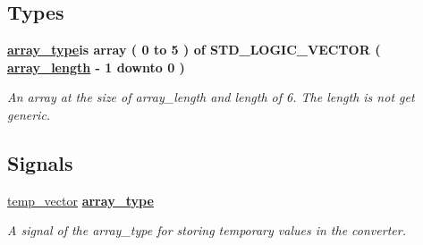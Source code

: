 \subsection*{Types}
 \begin{DoxyCompactItemize}
\item 
\hypertarget{classbin2bcd_1_1converter_a30db87baa00a17c4425999fa5f359bb3}{{\bfseries \hyperlink{classbin2bcd_1_1converter_a30db87baa00a17c4425999fa5f359bb3}{array\-\_\-type}{\bfseries \textcolor{vhdlkeyword}{is}\textcolor{vhdlchar}{ }\textcolor{vhdlchar}{ }\textcolor{vhdlkeyword}{array}\textcolor{vhdlchar}{ }\textcolor{vhdlchar}{(}\textcolor{vhdlchar}{ } \textcolor{vhdldigit}{0} \textcolor{vhdlchar}{ }\textcolor{vhdlchar}{ }\textcolor{vhdlchar}{ }\textcolor{vhdlkeyword}{to}\textcolor{vhdlchar}{ }\textcolor{vhdlchar}{ }\textcolor{vhdlchar}{ } \textcolor{vhdldigit}{5} \textcolor{vhdlchar}{ }\textcolor{vhdlchar}{)}\textcolor{vhdlchar}{ }\textcolor{vhdlchar}{ }\textcolor{vhdlkeyword}{of}\textcolor{vhdlchar}{ }\textcolor{comment}{S\-T\-D\-\_\-\-L\-O\-G\-I\-C\-\_\-\-V\-E\-C\-T\-O\-R}\textcolor{vhdlchar}{ }\textcolor{vhdlchar}{(}\textcolor{vhdlchar}{ }\textcolor{vhdlchar}{ }{\bfseries \hyperlink{classbin2bcd_1_1converter_a0cc376987d43bd9d544cbaede089b0cf}{array\-\_\-length}} \textcolor{vhdlchar}{ }\textcolor{vhdlchar}{-\/}\textcolor{vhdlchar}{ } \textcolor{vhdldigit}{1} \textcolor{vhdlchar}{ }\textcolor{vhdlchar}{ }\textcolor{vhdlchar}{ }\textcolor{vhdlkeyword}{downto}\textcolor{vhdlchar}{ }\textcolor{vhdlchar}{ }\textcolor{vhdlchar}{ } \textcolor{vhdldigit}{0} \textcolor{vhdlchar}{ }\textcolor{vhdlchar}{)}\textcolor{vhdlchar}{ }}} }\label{classbin2bcd_1_1converter_a30db87baa00a17c4425999fa5f359bb3}

\begin{DoxyCompactList}\small\item\em An array at the size of array\-\_\-length and length of 6. The length is not get generic. \end{DoxyCompactList}\end{DoxyCompactItemize}
\subsection*{Signals}
 \begin{DoxyCompactItemize}
\item 
\hypertarget{classbin2bcd_1_1converter_aa35c068917536e24186e420d790f1c2f}{\hyperlink{classbin2bcd_1_1converter_aa35c068917536e24186e420d790f1c2f}{temp\-\_\-vector} {\bfseries {\bfseries \hyperlink{classbin2bcd_1_1converter_a30db87baa00a17c4425999fa5f359bb3}{array\-\_\-type}} \textcolor{vhdlchar}{ }} }\label{classbin2bcd_1_1converter_aa35c068917536e24186e420d790f1c2f}

\begin{DoxyCompactList}\small\item\em A signal of the array\-\_\-type for storing temporary values in the converter. \end{DoxyCompactList}\end{DoxyCompactItemize}
